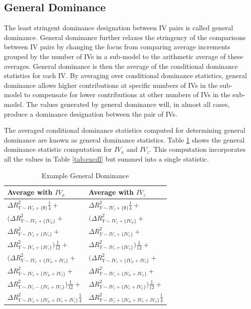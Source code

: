\documentclass[man]{apa7}
\begin{document}
	\subsection{General Dominance}
	
	The least stringent dominance designation between IV pairs is called general dominance.
	General dominance further relaxes the stringency of the comparisons between IV pairs by changing the focus from comparing average increments grouped by the number of IVs in a sub-model to the arithmetic average of these averages.
	General dominance is then the average of the conditional dominance statistics for each IV.
	By averaging over conditional dominance statistics, general dominance allows higher contributions at specific numbers of IVs in the sub-model to compensate for lower contributions at other numbers of IVs in the sub-model. 
	The values generated by general dominance will, in almost all cases, produce a dominance designation between the pair of IVs.
	
	The averaged conditional dominance statistics computed for determining general dominance are known as general dominance statistics. 
	Table \ref{tab:exgen} shows the general dominance statistic computation for $IV_x$ and $IV_z$.
	This computation incorporates all the values in Table \ref{tab:excdl} but summed into a single statistic.
	
		\begin{table}[h!]
		\centering
		\caption{\centering Example General Dominance}
		\begin{tabular}{ l l }
			Average with $IV_x$ & Average with $IV_z$ \\
			\hline
			$\Delta R^2_{Y \sim IV_x + \{\emptyset\}}\frac{1}{4} + $ & $\Delta R^2_{Y \sim IV_z + \{\emptyset\}}\frac{1}{4} +$ \\
			$(\Delta R^2_{Y \sim IV_x + \{IV_w\}} + $ & $(\Delta R^2_{Y \sim IV_z + \{IV_w\}} + $ \\
			$\Delta R^2_{Y \sim IV_x + \{IV_v\}} + $ & $\Delta R^2_{Y \sim IV_z + \{IV_v\}} + $ \\
			$\Delta R^2_{Y \sim IV_x + \{IV_z\}})\frac{1}{12} + $ & $\Delta R^2_{Y \sim IV_z + \{IV_x\}})\frac{1}{12} + $ \\
			$(\Delta R^2_{Y \sim IV_x + \{IV_w + IV_v\}} + $ & $(\Delta R^2_{Y \sim IV_z + \{IV_w + IV_v\}} + $ \\
			$\Delta R^2_{Y \sim IV_x + \{IV_w + IV_z\}} + $ & $\Delta R^2_{Y \sim IV_z + \{IV_w + IV_x\}} + $ \\
			$\Delta R^2_{Y \sim IV_x - \{IV_v + IV_z\}})\frac{1}{12} + $ & $\Delta R^2_{Y \sim IV_z + \{IV_v + IV_x\}})\frac{1}{12} +$ \\
			$\Delta R^2_{Y \sim IV_x + \{IV_w + IV_v + IV_z\}}\frac{1}{4}$ & $\Delta R^2_{Y \sim IV_z + \{IV_w + IV_v + IV_x\}}\frac{1}{4}$ \\
			\hline
		\end{tabular}
		\label{tab:exgen}
	\end{table}
\end{document}
